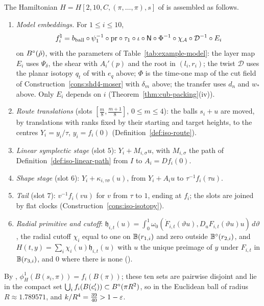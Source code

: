 The Hamiltonian $H=H[2,10,C,(\pi,\dots,\pi),s]$ of  is assembled as follows.
\begin{enumerate}[label=(\arabic*)]
\item \emph{Model embeddings.} For $1\le i\le10$,
\[
 f^\natural_i=b_{\rm ball}\circ\psi_1^{-1}\circ\mathrm{pr}\circ\tau_1\circ\iota\circ\mathsf N\circ\Phi^{-1}\circ\chi_{\mathcal A}
 \circ\mathcal D^{-1}\circ E_i
\]
on $B^{\circ}(\hat\rho)$, with the parameters of Table~\ref{tab:example-model}: the layer map $E_i$ uses $\Psi_\delta$, the shear
with $A_i'(p)$ and the root in $(l_i,r_i)$; the twist $\mathcal D$ uses the planar isotopy $q_t$ of
 with $e_q$ above; $\Phi$ is the time-one map of the cut field of
Construction~\ref{cons:shd4-moser} with $\delta_m$ above; the transfer uses $d_n$ and $w_*$ above. Only $E_i$ depends on $i$
(Theorem~\ref{thm:cub-packing}(iv)).
\item \emph{Route translations} (slots $[\frac m8,\frac{m+1}8]$, $0\le m\le4$): the balls $s_i+u$ are moved, by translations
with ranks fixed by their starting and target heights, to the centres $Y_i=y_i/\tau$, $y_i=f_i(0)$
(Definition~\ref{def:iso-route}).
\item \emph{Linear symplectic stage} (slot $5$): $Y_i+M_{i,\sigma}u$, with $M_{i,\sigma}$ the path of
Definition~\ref{def:iso-linear-path} from $I$ to $A_i=Df_i(0)$.
\item \emph{Shape stage} (slot $6$): $Y_i+\kappa_{i,\tau\sigma}(u)$, from $Y_i+A_iu$ to $\tau^{-1}f_i(\tau u)$.
\item \emph{Tail} (slot $7$): $v^{-1}f_i(vu)$ for $v$ from $\tau$ to $1$, ending at $f_i$; the slots are joined by flat
clocks (Construction~\ref{cons:iso-isotopy}).
\item \emph{Radial primitive and cutoff}: $\mathfrak h_{i,t}(u)=\int_0^1\omega_0(\dot F_{i,t}(\vartheta u),D_uF_{i,t}(\vartheta u)u)\,d\vartheta$,
the radial cutoff $\chi_i$ equal to one on $\mathbb{B}(r_{1,i})$ and zero outside $\mathbb{B}^\circ(r_{2,i})$, and
$H(t,y)=\sum_i\chi_i(u)\mathfrak h_{i,t}(u)$ with $u$ the unique preimage of $y$ under $F_{i,t}$ in $\mathbb{B}(r_{3,i})$, and $0$
where there is none ().
\end{enumerate}
By , $\phi^1_H(B(s_i,\pi))=f_i(B(\pi))$; these ten sets are pairwise disjoint and lie in the
compact set $\bigcup_if_i(B(c'_i))\subset B^{\circ}(\pi R^2)$, so in the Euclidean ball of radius $R\approx1.789571$, and
$k/R^4=\frac{39}{40}>1-\varepsilon$.

